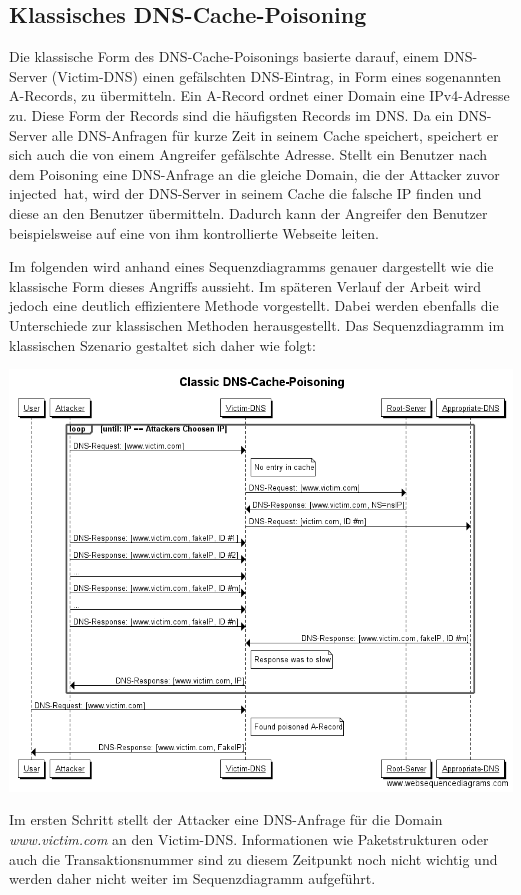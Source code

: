 \documentclass[10pt,a4paper]{article}
\begin{document}
\subsection{Klassisches DNS-Cache-Poisoning}
Die klassische Form des DNS-Cache-Poisonings basierte darauf, einem DNS-Server (Victim-DNS) einen gefälschten DNS-Eintrag, in Form eines sogenannten A-Records, zu übermitteln. Ein A-Record ordnet einer Domain eine  IPv4-Adresse zu. Diese Form der Records sind die häufigsten Records im DNS. Da ein DNS-Server alle DNS-Anfragen für kurze Zeit in seinem Cache speichert, speichert er sich auch die von einem Angreifer gefälschte Adresse. Stellt ein Benutzer nach dem Poisoning eine DNS-Anfrage an die gleiche Domain, die der Attacker zuvor \glqq injected\grqq\ hat, wird der DNS-Server in seinem Cache die falsche IP finden und diese an den Benutzer übermitteln. Dadurch kann der Angreifer den Benutzer beispielsweise auf eine von ihm kontrollierte Webseite leiten. 

Im folgenden wird anhand eines Sequenzdiagramms genauer dargestellt wie die klassische Form dieses Angriffs aussieht. Im späteren Verlauf der Arbeit wird jedoch eine deutlich effizientere Methode vorgestellt. Dabei werden ebenfalls die Unterschiede zur klassischen Methoden herausgestellt. Das Sequenzdiagramm im klassischen Szenario gestaltet sich daher wie folgt:

{
\centering
\includegraphics[scale=0.45]{Classic_DNS-Cache-Poisoning.png}
}

Im ersten Schritt stellt der Attacker eine DNS-Anfrage für die Domain \emph{www.victim.com} an den Victim-DNS. Informationen wie Paketstrukturen oder auch die Transaktionsnummer sind zu diesem Zeitpunkt noch nicht wichtig und werden daher nicht weiter im Sequenzdiagramm aufgeführt.
\end{document}
